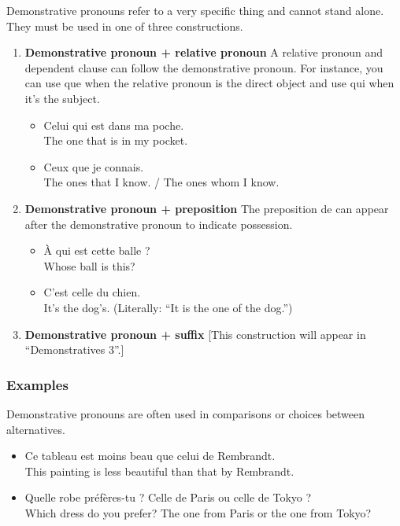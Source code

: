Demonstrative pronouns refer to a very specific thing and cannot stand alone. They must be used in one of three constructions.

\begin{enumerate}
  \item  \textbf{Demonstrative pronoun + relative pronoun}  A relative pronoun and dependent clause can follow the demonstrative pronoun. For instance, you can use que when the relative pronoun is the direct object and use qui when it's the subject.
  
  \begin{itemize}
  \item  Celui qui est dans ma poche. \\ The one that is in my pocket.
  \item  Ceux que je connais. \\ The ones that I know. / The ones whom I know.
  \end{itemize}
  
  \item  \textbf{Demonstrative pronoun + preposition}  The preposition de can appear after the demonstrative pronoun to indicate possession.
  
  \begin{itemize}
  \item  {\`A} qui est cette balle ? \\ Whose ball is this?
  \item  C'est celle du chien. \\ It's the dog's. (Literally: ``It is the one of the dog.'')
  \end{itemize}    
  
  \item  \textbf{Demonstrative pronoun + suffix}  [This construction will appear in ``Demonstratives 3''.]
\end{enumerate}

\subsubsection{Examples}

Demonstrative pronouns are often used in comparisons or choices between alternatives.

\begin{itemize}
  \item  Ce tableau est moins beau que celui de Rembrandt. \\ This painting is less beautiful than that by Rembrandt.
  \item  Quelle robe pr{\'e}f{\`e}res-tu ? Celle de Paris ou celle de Tokyo ? \\ Which dress do you prefer? The one from Paris or the one from Tokyo?
\end{itemize}

